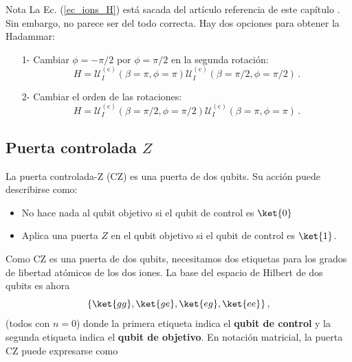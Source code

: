\begin{mybox_blue}{Nota}
    La Ec. (\ref{ec_ions_H}) está sacada del artículo referencia de este capítulo \cite{bib_ions_main}. Sin embargo, no parece ser del todo correcta. Hay dos opciones para obtener la Hadammar:
    \begin{itemize}
        \item[1-] Cambiar $\phi = -\pi/2$ por $\phi = \pi/2$ en la segunda rotación:
            \begin{equation}  \label{ec_ions_H}
        	H = \mathcal{U}_I^{(\text{c})}(\beta = \pi, \phi = \pi) \mathcal{U}_I^{(\text{c})}(\beta = \pi/2, \phi = \pi/2) \, .
    	\end{equation}
        \item[2-] Cambiar el orden de las rotaciones:
            \begin{equation}  \label{ec_ions_H}
        	H = \mathcal{U}_I^{(\text{c})}(\beta = \pi/2, \phi = \pi/2)  \mathcal{U}_I^{(\text{c})}(\beta = \pi, \phi = \pi) \,.
    	\end{equation}
    \end{itemize}
\end{mybox_blue}




\subsection{Puerta controlada $Z$}

La puerta controlada-Z (CZ) es una puerta de dos qubits. Su acción puede describirse como:
\begin{itemize}
\item No hace nada al qubit objetivo si el qubit de control es $\ket{0}$
\item Aplica una puerta $Z$ en el qubit objetivo si el qubit de control es $\ket{1}$.
\end{itemize}
 
Como CZ es una puerta de dos qubits, necesitamos dos etiquetas para los grados de libertad atómicos de los dos iones. La base del espacio de Hilbert de dos qubits es ahora 
	\begin{equation*}
	\{\ket{gg}, \ket{ge}, \ket{eg}, \ket{ee} \}\, , 
	\end{equation*}
(todos con $n=0$) donde la primera etiqueta indica el \textbf{qubit de control} y la segunda etiqueta indica el \textbf{qubit de objetivo}. En notación matricial, la puerta CZ puede expresarse como

